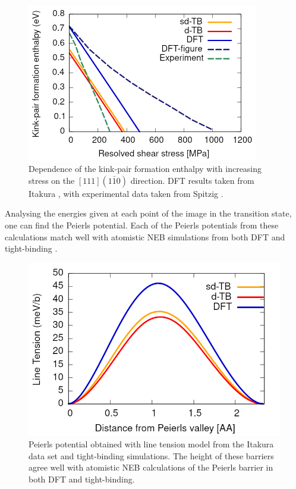 \documentclass[a4paper,11pt]{article}
\begin{document}
\begin{figure}[htbp]

\includegraphics[width=0.9\textwidth]{Images/kink-pair_formation_enthalpies_corrected.png}
\caption{Dependence of the kink-pair formation enthalpy with increasing stress on the \([111](1\bar{1}0)\) direction. DFT results taken from Itakura \cite{Itakura2012}, with experimental data taken from Spitzig \cite{Spitzig_1970}    \label{kinkpairstress}.}
\end{figure}

Analysing the energies given at each point of the image in the transition state, one
can find the Peierls potential. Each of the Peierls potentials from these calculations
match well with atomistic NEB simulations from both DFT and tight-binding
\cite{Ventelon_2013,Simpson2019}.

\begin{figure}[htbp]
\centering
\includegraphics[width=.9\linewidth]{Images/fe_peierls_potential_pure.png}
\caption{Peierls potential obtained with line tension model from the Itakura data set and tight-binding simulations. The height of these barriers agree well with atomistic NEB calculations of the Peierls barrier in both DFT and tight-binding.}
\end{figure}
\end{document}
